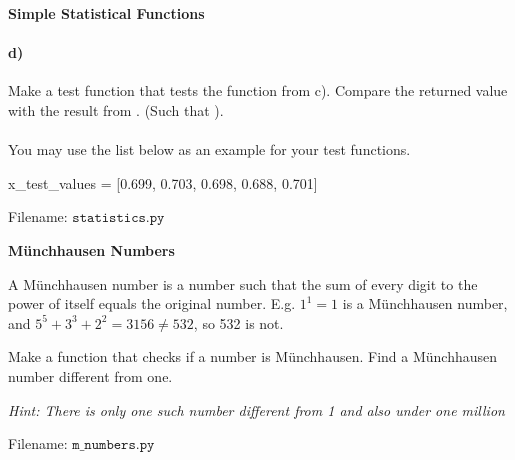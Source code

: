 \begin{Problem}{\textbf{Simple Statistical Functions}}
\paragraph{d)} Make a test function  that tests the function from c). Compare the returned value with the result from
. (Such that ).

\paragraph{} You may use the list below as an example for your test functions.
\begin{python}
x_test_values = [0.699, 0.703, 0.698, 0.688, 0.701]
\end{python}

Filename: $\texttt{statistics.py}$
\end{Problem}

\begin{Problem}{\textbf{Münchhausen Numbers}}

\noindent A Münchhausen number is a number such that the sum of every digit to the power
of itself equals the original number. E.g. $1^1 = 1$ is a Münchhausen number, and
 $5^5 + 3^3 + 2^2 = 3156\neq 532$, so 532 is not.

Make a function that checks if a number is Münchhausen. Find a Münchhausen number different from one.

\emph{Hint: There is only one such number different from 1 and also under one million}

Filename: $\texttt{m\_numbers.py}$
\end{Problem}
